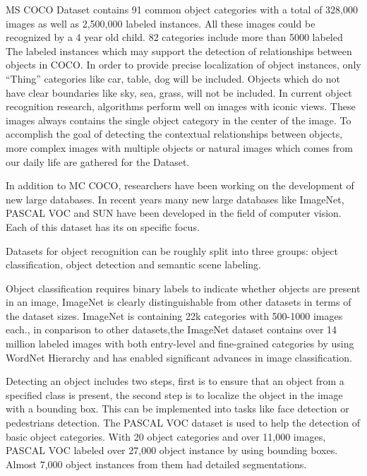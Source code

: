 \documentclass[
]{krantz}
\begin{document}
MS COCO Dataset contains 91 common object categories with a total of 328,000 images as well as 2,500,000 labeled instances. All these images could be recognized by a 4 year old child. 82 categories include more than 5000 labeled The labeled instances which may support the detection of relationships between objects in COCO. In order to provide precise localization of object instances, only ``Thing'' categories like car, table, dog will be included. Objects which do not have clear boundaries like sky, sea, grass, will not be included. In current object recognition research, algorithms perform well on images with iconic views. These images always contains the single object category in the center of the image. To accomplish the goal of detecting the contextual relationships between objects, more complex images with multiple objects or natural images which comes from our daily life are gathered for the Dataset.

In addition to MC COCO, researchers have been working on the development of new large databases. In recent years many new large databases like ImageNet, PASCAL VOC and SUN have been developed in the field of computer vision. Each of this dataset has its on specific focus.

Datasets for object recognition can be roughly split into three groups: object classification, object detection and semantic scene labeling.

Object classification requires binary labels to indicate whether objects are present in an image, ImageNet \citep{deng2009imagenet} is clearly distinguishable from other datasets in terms of the dataset sizes. ImageNet is containing 22k categories with 500-1000 images each.\citep{mccoco}, in conparison to other datasets,the ImageNet dataset contains over 14 million labeled images with both entry-level and fine-grained categories by using WordNet Hierarchy and has enabled significant advances in image classification.

Detecting an object includes two steps, first is to ensure that an object from a specified class is present, the second step is to localize the object in the image with a bounding box. This can be implemented into tasks like face detection or pedestrians detection. The PASCAL VOC \citep{pascalvoc} dataset is used to help the detection of basic object categories. With 20 object categories and over 11,000 images, PASCAL VOC labeled over 27,000 object instance by using bounding boxes. Almost 7,000 object instances from them had detailed segmentations. \citep{mccoco}
\end{document}
